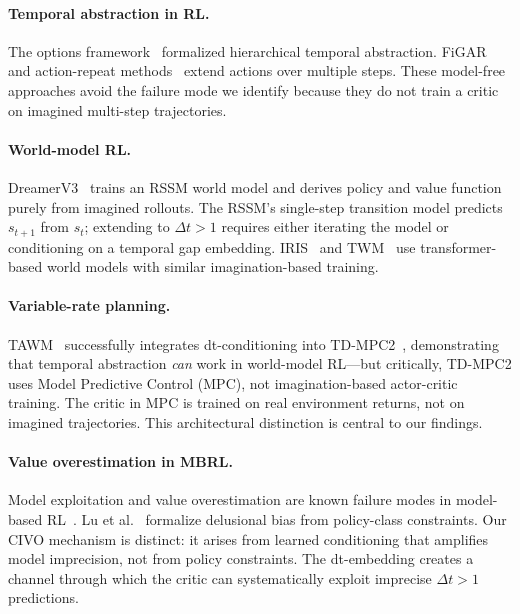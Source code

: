 \documentclass[10pt,letterpaper]{article}
\begin{document}
\paragraph{Temporal abstraction in RL.}
The options framework~\cite{sutton1999options} formalized hierarchical temporal abstraction. FiGAR~\cite{sharma2017figar} and action-repeat methods~\cite{lakshminarayanan2017dynamic} extend actions over multiple steps. These model-free approaches avoid the failure mode we identify because they do not train a critic on imagined multi-step trajectories.

\paragraph{World-model RL.}
DreamerV3~\cite{hafner2023dreamerv3} trains an RSSM world model and derives policy and value function purely from imagined rollouts. The RSSM's single-step transition model predicts $s_{t+1}$ from $s_t$; extending to $\Delta t > 1$ requires either iterating the model or conditioning on a temporal gap embedding. IRIS~\cite{micheli2023iris} and TWM~\cite{robine2023twm} use transformer-based world models with similar imagination-based training.

\paragraph{Variable-rate planning.}
TAWM~\cite{nhu2025tawm} successfully integrates dt-conditioning into TD-MPC2~\cite{hansen2024tdmpc2}, demonstrating that temporal abstraction \emph{can} work in world-model RL---but critically, TD-MPC2 uses Model Predictive Control (MPC), not imagination-based actor-critic training. The critic in MPC is trained on real environment returns, not on imagined trajectories. This architectural distinction is central to our findings.

\paragraph{Value overestimation in MBRL.}
Model exploitation and value overestimation are known failure modes in model-based RL~\cite{janner2019mbpo,chua2018pets}. Lu et al.~\cite{lu2018nondelusional} formalize delusional bias from policy-class constraints. Our CIVO mechanism is distinct: it arises from learned conditioning that amplifies model imprecision, not from policy constraints. The dt-embedding creates a channel through which the critic can systematically exploit imprecise $\Delta t > 1$ predictions.
\end{document}
